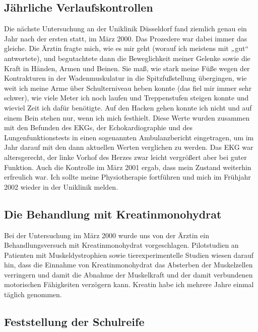 \documentclass[fontsize=14pt,a4paper,headinclude,DIV=calc,automark]{scrbook}
\begin{document}
\subsection{Jährliche Verlaufskontrollen}

Die nächste Untersuchung an der Uniklinik Düsseldorf fand ziemlich genau ein Jahr nach der ersten statt, im März 2000. Das Prozedere war dabei immer das gleiche. Die Ärztin fragte mich, wie es mir geht (worauf ich meistens mit „gut“ antwortete), und begutachtete dann die Beweglichkeit meiner Gelenke sowie die Kraft in Händen, Armen und Beinen. Sie maß, wie stark meine Füße wegen der Kontrakturen in der Wadenmuskulatur in die Spitzfußstellung übergingen, wie weit ich meine Arme über Schulterniveau heben konnte (das fiel mir immer sehr schwer), wie viele Meter ich noch laufen und Treppenstufen steigen konnte und wieviel Zeit ich dafür benötigte. Auf den Hacken gehen konnte ich nicht und auf einem Bein stehen nur, wenn ich mich festhielt. Diese Werte wurden zusammen mit den Befunden des EKGs, der Echokardiographie und des Lungenfunktionstests in einen sogenannten Ambulanzbericht eingetragen, um im Jahr darauf mit den dann aktuellen Werten verglichen zu werden. Das EKG war altersgerecht, der linke Vorhof des Herzes zwar leicht vergrößert aber bei guter Funktion. Auch die Kontrolle im März 2001 ergab, dass mein Zustand weiterhin erfreulich war. Ich sollte meine Physiotherapie fortführen und mich im Frühjahr 2002 wieder in der Uniklinik melden.

\subsection{Die Behandlung mit Kreatinmonohydrat}

Bei der Untersuchung im März 2000 wurde uns von der Ärztin ein Behandlungsversuch mit Kreatinmonohydrat vorgeschlagen. Pilotstudien an Patienten mit Muskeldystrophien sowie tierexperimentelle Studien wiesen darauf hin, dass die Einnahme von Kreatinmonohydrat das Absterben der Muskelzellen verringern und damit die Abnahme der Muskelkraft und der damit verbundenen motorischen Fähigkeiten verzögern kann. Kreatin habe ich mehrere Jahre einmal täglich genommen.

\subsection{Feststellung der Schulreife}
\end{document}
